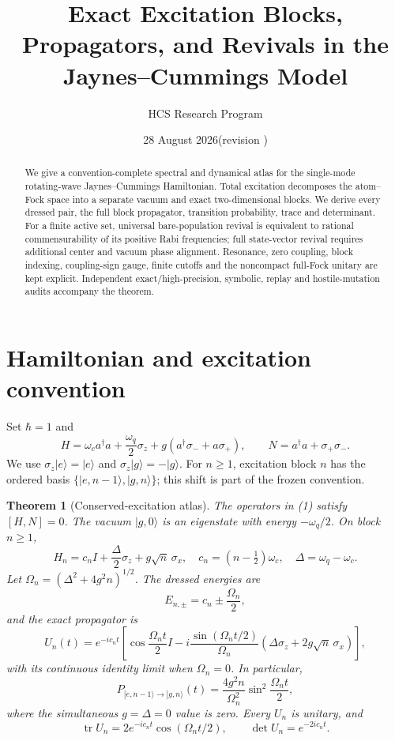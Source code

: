 \documentclass[11pt]{article}
\title{Exact Excitation Blocks, Propagators, and Revivals in the Jaynes--Cummings Model}
\author{HCS Research Program}
\date{28 August 2026\quad (revision \CRevisionRound)}
\newtheorem{theorem}{Theorem}
\begin{document}
\maketitle

\begin{abstract}
We give a convention-complete spectral and dynamical atlas for the single-mode
rotating-wave Jaynes--Cummings Hamiltonian.  Total excitation decomposes the
atom--Fock space into a separate vacuum and exact two-dimensional blocks.  We
derive every dressed pair, the full block propagator, transition probability,
trace and determinant.  For a finite active set, universal bare-population
revival is equivalent to rational commensurability of its positive Rabi
frequencies; full state-vector revival requires additional center and vacuum
phase alignment.  Resonance, zero coupling, block indexing, coupling-sign
gauge, finite cutoffs and the noncompact full-Fock unitary are kept explicit.
Independent exact/high-precision, symbolic, replay and hostile-mutation audits
accompany the theorem.
\end{abstract}

\section{Hamiltonian and excitation convention}
Set $\hbar=1$ and
\[
 H=\omega_c a^\dagger a+\frac{\omega_q}{2}\sigma_z
   +g(a^\dagger\sigma_-+a\sigma_+),\qquad
 N=a^\dagger a+\sigma_+\sigma_- .                       \tag{1}
\]
We use $\sigma_z|e\rangle=|e\rangle$ and
$\sigma_z|g\rangle=-|g\rangle$.  For $n\ge1$, excitation block $n$ has the
ordered basis $\{|e,n-1\rangle,|g,n\rangle\}$; this shift is part of the
frozen convention.

\begin{theorem}[Conserved-excitation atlas]\label{thm:block}
The operators in (1) satisfy $[H,N]=0$.  The vacuum $|g,0\rangle$ is an
eigenstate with energy $-\omega_q/2$.  On block $n\ge1$,
\[
 H_n=c_nI+\frac{\Delta}{2}\sigma_z+g\sqrt n\,\sigma_x,
 \quad c_n=(n-\tfrac12)\omega_c,
 \quad \Delta=\omega_q-\omega_c .                       \tag{2}
\]
Let $\Omega_n=(\Delta^2+4g^2n)^{1/2}$.  The dressed energies are
\[
 E_{n,\pm}=c_n\pm\frac{\Omega_n}{2},                    \tag{3}
\]
and the exact propagator is
\[
 U_n(t)=e^{-ic_nt}\left[
 \cos\frac{\Omega_nt}{2}I
 -i\frac{\sin(\Omega_nt/2)}{\Omega_n}
 (\Delta\sigma_z+2g\sqrt n\,\sigma_x)\right],           \tag{4}
\]
with its continuous identity limit when $\Omega_n=0$.  In particular,
\[
 P_{|e,n-1\rangle\to|g,n\rangle}(t)
 =\frac{4g^2n}{\Omega_n^2}\sin^2\frac{\Omega_nt}{2},    \tag{5}
\]
where the simultaneous $g=\Delta=0$ value is zero.  Every $U_n$ is unitary,
and
\[
 \operatorname{tr}U_n=2e^{-ic_nt}\cos(\Omega_nt/2),
 \qquad \det U_n=e^{-2ic_nt}.                            \tag{6}
\]
\end{theorem}
\end{document}

